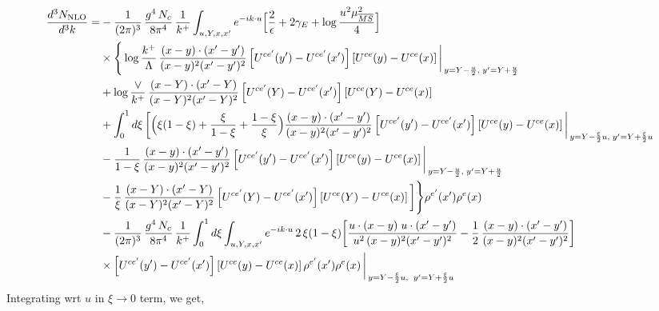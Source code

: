 \documentclass[9pt]{article}
\numberwithin{equation}{section}
\begin{document}
\begin{align}
\frac{d^{3}N_{\rm NLO}}{d^{3}k}= &-\frac{1}{(2\pi)^{3}}\,\frac{g^{4}\,N_{c}}{8\pi^{4}}\,\frac{1}{k^{+}}\int_{u,Y,x,x'}e^{-ik\cdot u}\Big[\frac{2}{\epsilon}+2\gamma_{E}+\log\frac{u^{2}\mu^{2}_{\overline{MS}}}{4}\Big]\notag\\
&\times\Bigg\{\log\frac{k^{+}}{\Lambda}\,\frac{(x-y)\cdot(x'-y')}{(x-y)^{2}(x'-y')^{2}}\left[U^{ce'}(y') - U^{ce'}(x')\right]\left[U^{ce}(y) - U^{ce}(x)\right]\bigg|_{\,y=Y-\frac{u}{2},\;y'=Y+\frac{u}{2}}\notag\\
&+\log\frac{\vee}{k^{+}}\,\frac{(x-Y)\cdot(x'-Y)}{(x-Y)^{2}(x'-Y)^{2}}\left[U^{ce'}(Y) - U^{ce'}(x')\right]\left[U^{ce}(Y) - U^{ce}(x)\right]\notag\\
&+\int_{0}^{1}d\xi\,\bigg[\Big(\xi(1-\xi)+\frac{\xi}{1-\xi}+\frac{1-\xi}{\xi}\Big)\frac{(x-y)\cdot(x'-y')}{(x-y)^{2}(x'-y')^{2}}\left[U^{ce'}(y') - U^{ce'}(x')\right]\left[U^{ce}(y) - U^{ce}(x)\right]\bigg|_{\,y=Y-\frac{\xi}{2}u,\;y'=Y+\frac{\xi}{2}u}\notag\\
&-\frac{1}{1-\xi}\,\frac{(x-y)\cdot(x'-y')}{(x-y)^{2}(x'-y')^{2}}\left[U^{ce'}(y') - U^{ce'}(x')\right]\left[U^{ce}(y) - U^{ce}(x)\right]\bigg|_{\,y=Y-\frac{u}{2},\;y'=Y+\frac{u}{2}}\notag\\
&-\frac{1}{\xi}\,\frac{(x-Y)\cdot(x'-Y)}{(x-Y)^{2}(x'-Y)^{2}}\left[U^{ce'}(Y) - U^{ce'}(x')\right]\left[U^{ce}(Y) - U^{ce}(x)\right]\bigg]\Bigg\}\rho^{e'}(x')\rho^{e}(x)\notag\\
&-\frac{1}{(2\pi)^{3}}\,\frac{g^{4}\,N_{c}}{8\pi^{4}}\,\frac{1}{k^{+}}\int_{0}^{1}d\xi\int_{u,Y,x,x'}e^{-ik\cdot u}\,2\,\xi(1-\xi)\bigg[\frac{u\cdot(x-y)\;u\cdot(x'-y')}{u^{2}\,(x-y)^{2}(x'-y')^{2}}-\frac{1}{2}\,\frac{(x-y)\cdot(x'-y')}{(x-y)^{2}(x'-y')^{2}}\bigg]\notag\\
&\times\left[U^{ce'}(y') - U^{ce'}(x')\right]\left[U^{ce}(y) - U^{ce}(x)\right]\rho^{e'}(x')\rho^{e}(x)\,\bigg|_{\,y=Y-\frac{\xi}{2}u,\;\;y'=Y+\frac{\xi}{2}u}
\end{align}
Integrating wrt $u$ in $\xi\to 0$ term, we get,
\end{document}
